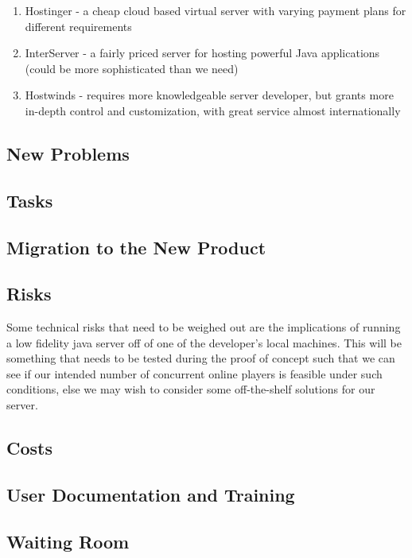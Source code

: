 \documentclass[12pt, titlepage]{article}
\begin{document}
\begin{enumerate}
    \item Hostinger - a cheap cloud based virtual server with varying payment plans for different requirements
    \item InterServer - a fairly priced server for hosting powerful Java applications (could be more sophisticated than we need) 
    \item Hostwinds - requires more knowledgeable server developer, but grants more in-depth control and customization, with great service almost internationally
\end{enumerate}

\subsection{New Problems}

\subsection{Tasks}

\subsection{Migration to the New Product}

\subsection{Risks}
Some technical risks that need to be weighed out are the implications of running a low fidelity java server off of one of the developer's local machines. This will be something that needs to be tested during the proof of concept such that we can see if our intended number of concurrent online players is feasible under such conditions, else we may wish to consider some off-the-shelf solutions for our server. 

\subsection{Costs}

\subsection{User Documentation and Training}

\subsection{Waiting Room}
\end{document}
